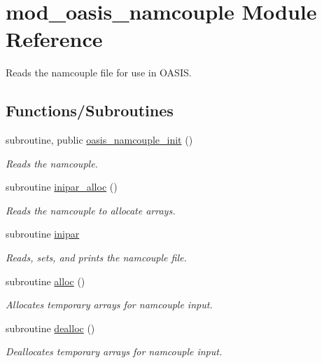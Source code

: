 \hypertarget{namespacemod__oasis__namcouple}{}\section{mod\+\_\+oasis\+\_\+namcouple Module Reference}
\label{namespacemod__oasis__namcouple}


Reads the namcouple file for use in O\+A\+S\+IS.  


\subsection*{Functions/\+Subroutines}
\begin{DoxyCompactItemize}
\item 
subroutine, public \hyperlink{namespacemod__oasis__namcouple_ab57c69ae534734f92a85e24a3389e972}{oasis\+\_\+namcouple\+\_\+init} ()
\begin{DoxyCompactList}\small\item\em Reads the namcouple. \end{DoxyCompactList}\item 
subroutine \hyperlink{namespacemod__oasis__namcouple_acb43892c17b5f8c8b360effb5a811c27}{inipar\+\_\+alloc} ()
\begin{DoxyCompactList}\small\item\em Reads the namcouple to allocate arrays. \end{DoxyCompactList}\item 
subroutine \hyperlink{namespacemod__oasis__namcouple_a6da9d2285766ceb22ea8449f55201d84}{inipar}
\begin{DoxyCompactList}\small\item\em Reads, sets, and prints the namcouple file. \end{DoxyCompactList}\item 
subroutine \hyperlink{namespacemod__oasis__namcouple_a0d85a5dcb3fab17a680cceed332b9668}{alloc} ()
\begin{DoxyCompactList}\small\item\em Allocates temporary arrays for namcouple input. \end{DoxyCompactList}\item 
subroutine \hyperlink{namespacemod__oasis__namcouple_abf09a0e902f44f77874a75bb4a7fba33}{dealloc} ()
\begin{DoxyCompactList}\small\item\em Deallocates temporary arrays for namcouple input. \end{DoxyCompactList}\item 

\end{DoxyCompactItemize}
